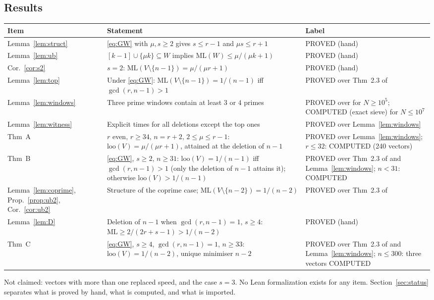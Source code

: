 \documentclass[11pt]{article}
\theoremstyle{remark}
\newcommand{\ML}{\mathrm{ML}}
\newcommand{\loo}{\mathrm{loo}}
\begin{document}
\subsection{Results}\label{sec:results}
\begin{center}\footnotesize
\begin{tabular}{@{}lL{7.3cm}L{3.6cm}@{}}
\toprule
Item & Statement & Label\\
\midrule
Lemma~\ref{lem:struct} & \eqref{eq:GW} with $\mu,s\ge2$ gives $s\le r-1$ and $\mu s\le r+1$ & PROVED (hand)\\
Lemma~\ref{lem:ub} & $[k-1]\cup\{\mu k\}\subseteq W$ implies $\ML(W)\le\mu/(\mu k+1)$ & PROVED (hand)\\
Cor.~\ref{cor:s2} & $s=2$: $\ML(V\setminus\{n-1\})=\mu/(\mu r+1)$ & PROVED (hand)\\
Lemma~\ref{lem:top} & Under \eqref{eq:GW}: $\ML(V\setminus\{n-1\})=1/(n-1)$ iff $\gcd(r,n-1)>1$ & PROVED over Thm~2.3 of \cite{GW06}\\
Lemma~\ref{lem:windows} & Three prime windows contain at least $3$ or $4$ primes & PROVED over \cite{Dusart10} for $N\ge10^5$; COMPUTED (exact sieve) for $N\le10^7$\\
Lemma~\ref{lem:witness} & Explicit times for all deletions except the top ones & PROVED over Lemma~\ref{lem:windows}\\
Thm~A & $r$ even, $r\ge34$, $n=r+2$, $2\le\mu\le r-1$: $\loo(V)=\mu/(\mu r+1)$, attained at the deletion of $n-1$ & PROVED over Lemma~\ref{lem:windows}; $r\le32$: COMPUTED (240 vectors)\\
Thm~B & \eqref{eq:GW}, $s\ge2$, $n\ge31$: $\loo(V)=1/(n-1)$ iff $\gcd(r,n-1)>1$ (only the deletion of $n-1$ attains it); otherwise $\loo(V)>1/(n-1)$ & PROVED over Thm~2.3 of \cite{GW06} and Lemma~\ref{lem:windows}; $n<31$: COMPUTED\\
Lemma~\ref{lem:coprime}, Prop.~\ref{prop:ub2}, Cor.~\ref{cor:ub2} & Structure of the coprime case; $\ML(V\setminus\{n-2\})=1/(n-2)$ & PROVED over Thm~2.3 of \cite{GW06}\\
Lemma~\ref{lem:D} & Deletion of $n-1$ when $\gcd(r,n-1)=1$, $s\ge4$: $\ML\ge2/(2r+s-1)>1/(n-2)$ & PROVED (hand)\\
Thm~C & \eqref{eq:GW}, $s\ge4$, $\gcd(r,n-1)=1$, $n\ge33$: $\loo(V)=1/(n-2)$, unique minimiser $n-2$ & PROVED over Thm~2.3 of \cite{GW06} and Lemma~\ref{lem:windows}; $n\le300$: three vectors COMPUTED\\
\bottomrule
\end{tabular}
\end{center}
Not claimed: vectors with more than one replaced speed, and the case $s=3$. No Lean formalization exists for any item. Section~\ref{sec:status} separates what is proved by hand, what is computed, and what is imported.
\end{document}

